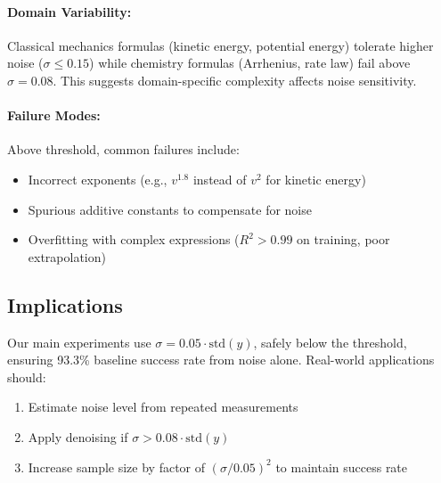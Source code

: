 \documentclass[twoside,11pt]{article}
\begin{document}
\paragraph{Domain Variability:}
Classical mechanics formulas (kinetic energy, potential energy) tolerate higher noise ($\sigma \leq 0.15$) while chemistry formulas (Arrhenius, rate law) fail above $\sigma = 0.08$. This suggests domain-specific complexity affects noise sensitivity.

\paragraph{Failure Modes:}
Above threshold, common failures include:
\begin{itemize}
\item Incorrect exponents (e.g., $v^{1.8}$ instead of $v^2$ for kinetic energy)
\item Spurious additive constants to compensate for noise
\item Overfitting with complex expressions ($R^2 > 0.99$ on training, poor extrapolation)
\end{itemize}

\subsection{Implications}

Our main experiments use $\sigma = 0.05 \cdot \text{std}(y)$, safely below the threshold, ensuring 93.3\% baseline success rate from noise alone. Real-world applications should:
\begin{enumerate}
\item Estimate noise level from repeated measurements
\item Apply denoising if $\sigma > 0.08 \cdot \text{std}(y)$
\item Increase sample size by factor of $(\sigma / 0.05)^2$ to maintain success rate
\end{enumerate}

\end{document}
